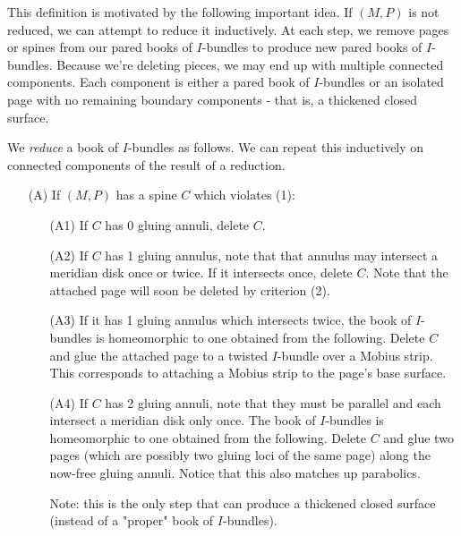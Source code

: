 This definition is motivated by the following important idea. If $(M,P)$ is not
reduced, we can attempt to reduce it inductively. At each step, we remove pages
or spines from our pared books of $I$-bundles to produce new pared books of
$I$-bundles.  Because we're deleting pieces, we may end up with multiple
connected components. Each component is either a pared book of $I$-bundles or
an isolated page with no remaining boundary components - that is, a thickened
closed surface.

\begin{defn}

We \emph{reduce} a book of $I$-bundles as follows. We can repeat this
inductively on connected components of the result of a reduction.

\begin{enumerate}

\item[(A)] If $(M,P)$ has a spine $C$ which violates (1):

\begin{enumerate}

\item[(A1)] If $C$ has 0 gluing annuli, delete $C$.

\item[(A2)] If $C$ has 1 gluing annulus, note that that annulus may intersect
a meridian disk once or twice. If it intersects once, delete $C$. Note that the
attached page will soon be deleted by criterion (2).

\item[(A3)] If it has 1 gluing annulus which intersects twice, the book of
$I$-bundles is homeomorphic to one obtained from the following.  Delete $C$ and
glue the attached page to a twisted $I$-bundle over a Mobius strip. This
corresponds to attaching a Mobius strip to the page's base surface.

\item[(A4)] If $C$ has 2 gluing annuli, note that they must be parallel and
each intersect a meridian disk only once. The book of $I$-bundles is
homeomorphic to one obtained from the following. Delete $C$ and glue two pages
(which are possibly two gluing loci of the same page) along the now-free gluing
annuli.  Notice that this also matches up parabolics.

Note: this is the only step that can produce a thickened closed surface
(instead of a "proper" book of $I$-bundles).

\end{enumerate}


\end{enumerate}
\end{defn}
